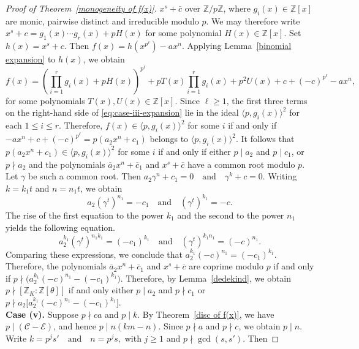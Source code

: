 \documentclass[10pt,a4paper]{amsart}
\begin{document}
\begin{proof}[Proof of Theorem~\ref{monogeneity of f(x)}]
$x^{s}+\bar c$ over $\mathbb{Z}/p\mathbb{Z}$, where
$g_i(x)\in\mathbb{Z}[x]$ are monic, pairwise distinct and irreducible
modulo $p$. We may therefore write $x^{s}+c = g_{1}(x)\cdots g_{r}(x) + pH(x)$ for some polynomial $H(x)\in\mathbb{Z}[x]$. Set $h(x)=x^{s}+c$.
Then $f(x)=h(x^{p^{\ell}})-ax^{n}.$ Applying Lemma~\ref{binomial expansion} to $h(x)$, we obtain
\begin{equation}\label{eq:case-iii-expansion}
f(x)= \left(\prod_{i=1}^{r} g_i(x) + pH(x)\right)^{p^{\ell}}
   + pT(x)\prod_{i=1}^{r} g_i(x)
   + p^{2}U(x) + c + (-c)^{p^{\ell}} - ax^{n},
\end{equation} 
for some polynomials $T(x),U(x)\in\mathbb{Z}[x]$.
Since $\ell\ge 1$, the first three terms on the right-hand side of
\eqref{eq:case-iii-expansion} lie in the ideal
$\langle p, g_i(x)\rangle^{2}$ for each $1\le i\le r$.
Therefore,
$f(x)\in\langle p, g_i(x)\rangle^{2}$ for some $i$
if and only if $-ax^{n}+c+(-c)^{p^{\ell}} = p(a_{2}x^{n}+c_{1})$
belongs to $\langle p, g_i(x)\rangle^{2}$. It follows that
$p(a_{2}x^{n}+c_{1})\in\langle p, g_i(x)\rangle^{2}$
for some $i$ if and only if either $p\mid a_{2}$ and $p\mid c_{1}$,
or $p\nmid a_{2}$ and the polynomials
$\overline{a}_{2}x^{n}+\overline{c}_{1}$ and $x^{s}+\overline{c}$
have a common root modulo $p$. Let $\gamma$ be such a common root.
Then $a_{2}\gamma^{n}+c_{1}=0
\quad \text{and} \quad
\gamma^{k}+c=0.$ Writing $k=k_{1}t$ and $n=n_{1}t$, we obtain
\[
a_{2}(\gamma^{t})^{n_{1}}=-c_{1}
\quad \text{and} \quad
(\gamma^{t})^{k_{1}}=-c.
\]
The rise of the first equation to the power $k_{1}$ and the second to the power $n_{1}$ yields the following equation.
\[
a_{2}^{k_{1}}(\gamma^{t})^{n_{1}k_{1}}
=(-c_{1})^{k_{1}}
\quad \text{and} \quad
(\gamma^{t})^{k_{1}n_{1}}
=(-c)^{n_{1}}.
\]
Comparing these expressions, we conclude that $a_{2}^{k_{1}}(-c)^{n_{1}} = (-c_{1})^{k_{1}}.$ Therefore, the polynomials
$\overline{a}_{2}x^{n}+\overline{c}_{1}$ and $x^{s}+\overline{c}$
are coprime modulo $p$ if and only if $p\nmid \bigl(a_{2}^{k_{1}}(-c)^{n_{1}}-(-c_{1})^{k_{1}}\bigr).$ Therefore, by Lemma~\ref{dedekind}, we obtain $p\nmid [\mathbb{Z}_{K}:\mathbb{Z}[\theta]]$ if and only either $p\mid a_2$ and $p\nmid c_1$ or $p\nmid a_2\bigl[a_{2}^{k_{1}}(-c)^{n_{1}}-(-c_{1})^{k_{1}}\bigr]$.\\[2mm]
\textbf{Case (v).} Suppose $p \nmid ca$ and $p \mid k$. By Theorem~\ref{disc of f(x)}, we have 
$p \mid (\mathcal{C} - \mathcal{E})$, and hence $p \mid n(km - n).$
Since $p \nmid a$ and $p \nmid c$, we obtain $p \mid n$. Write $k = p^{j}s' \quad \text{and} \quad n = p^{j}s,$ with $j \ge 1$ and $p \nmid \gcd(s,s')$. Then

\end{proof}
\end{document}
